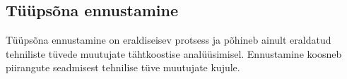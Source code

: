 \documentclass[12pt,a4paper]{article}
\begin{document}
%
%
%
%
%
%

\subsection{Tüüpsõna ennustamine}
\label{sec:ekstraktmorfoloogia-ennustamine}

Tüüpsõna ennustamine on eraldiseisev protsess ja põhineb ainult eraldatud tehniliste tüvede muutujate tähtkoostise analüüsimisel. Ennustamine koosneb piirangute seadmisest tehnilise tüve muutujate kujule.
\end{document}
